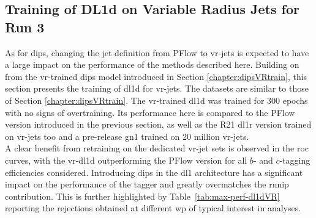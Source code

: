 \subsection{Training of DL1d on Variable Radius Jets for Run 3}\label{sec:VRdl1dTrain}
As for \gls{dips}, changing the jet definition from PFlow to \gls{vr}-jets is expected to have a large impact on the performance of the methods described here. Building on from the \gls{vr}-trained \gls{dips} model introduced in Section \ref{chapter:dipsVRtrain}, this section presents the training of \gls{dl1d} for \gls{vr}-jets. The datasets are similar to those of Section \ref{chapter:dipsVRtrain}. The \gls{vr}-trained \gls{dl1d} was trained for 300 epochs with no signs of overtraining. Its performance here is compared to the PFlow version introduced in the previous section, as well as the R21 \gls{dl1r} version trained on \gls{vr}-jets too and a pre-release \gls{gn1} trained on 20 million \gls{vr}-jets. \\

A clear benefit from retraining on the dedicated \gls{vr}-jet sets is observed in the \gls{roc} curves, with the \gls{vr}-\gls{dl1d} outperforming the PFlow version for all $b$- and $c$-tagging efficiencies considered. Introducing \gls{dips} in the \gls{dl1} architecture has a significant impact on the performance of the tagger and greatly overmatches the \gls{rnnip} contribution. This is further highlighted by Table~\ref{tab:max-perf-dl1dVR} reporting the rejections obtained at different \gls{wp} of typical interest in analyses. \\

